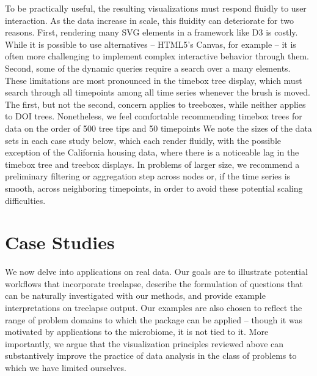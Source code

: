\documentclass[12pt]{article}
\begin{document}
To be practically useful, the resulting visualizations must respond fluidly to
user interaction. As the data increase in scale, this fluidity can deteriorate
for two reasons. First, rendering many SVG elements in a framework like D3 is
costly\citep{johnson2008scalability}. While it is possible to use alternatives
-- HTML5's Canvas, for example -- it is often more challenging to implement
complex interactive behavior through them. Second, some of the dynamic queries
require a search over a many elements. These limitations are most pronounced in
the timebox tree display, which must search through all timepoints among all
time series whenever the brush is moved. The first, but not the second, concern
applies to treeboxes, while neither applies to DOI trees. Nonetheless, we feel
comfortable recommending timebox trees for data on the order of 500 tree tips
and 50 timepoints We note the sizes of the data sets in each case study below,
which each render fluidly, with the possible exception of the California housing
data, where there is a noticeable lag in the timebox tree and treebox displays.
In problems of larger size, we recommend a preliminary filtering or aggregation
step across nodes or, if the time series is smooth, across neighboring
timepoints, in order to avoid these potential scaling difficulties.

\section{Case Studies}\label{case-studies}

We now delve into applications on real data. Our goals are to illustrate
potential workflows that incorporate treelapse, describe the formulation of
questions that can be naturally investigated with our methods, and provide
example interpretations on treelapse output. Our examples are also chosen to
reflect the range of problem domains to which the package can be applied --
though it was motivated by applications to the microbiome, it is not tied to it.
More importantly, we argue that the visualization principles reviewed above can
substantively improve the practice of data analysis in the class of problems to
which we have limited ourselves.
\end{document}
